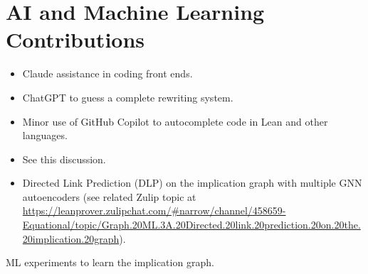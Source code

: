 \section{AI and Machine Learning Contributions}


\begin{itemize}
  \item Claude assistance in coding front ends.
  \item ChatGPT to guess a complete rewriting system.
  \item Minor use of GitHub Copilot to autocomplete code in Lean and other languages.
  \item See this discussion.
  \item Directed Link Prediction (DLP) on the implication graph with multiple GNN autoencoders (see related Zulip topic at \url{https://leanprover.zulipchat.com/#narrow/channel/458659-Equational/topic/Graph.20ML.3A.20Directed.20link.20prediction.20on.20the.20implication.20graph}).
\end{itemize}

ML experiments to learn the implication graph.
